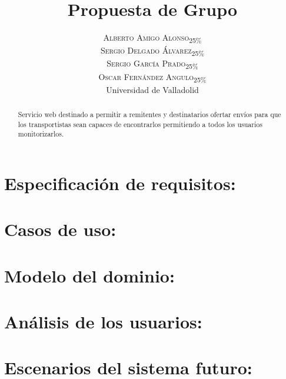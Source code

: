 \documentclass[10pt, a4paper,spanish]{article}
\title{\vspace{-15mm}\fontsize{24pt}{10pt}\selectfont\textbf{Propuesta de Grupo}} %
\author{
\large
\textsc{Alberto Amigo Alonso\textsubscript{25\%}}\\[2mm] %
\textsc{Sergio Delgado Álvarez\textsubscript{25\%}}\\[2mm] %
\textsc{Sergio García Prado\textsubscript{25\%}}\\[2mm] %
\textsc{Oscar Fernández Angulo\textsubscript{25\%}}\\[2mm] %
\normalsize Universidad de Valladolid \\ %
\vspace{-5mm}
}
\date{}
\begin{document}
	\maketitle %

	\thispagestyle{fancy} %


	\begin{abstract}
		\noindent Servicio web destinado a permitir a remitentes y destinatarios ofertar envíos para que los transportistas sean capaces de encontrarlos permitiendo a todos los usuarios monitorizarlos.
	\end{abstract}

	\section{Especificación de requisitos:}

		\paragraph{}


	\section{Casos de uso:}

		\paragraph{}


	\section{Modelo del dominio:}

		\paragraph{}


	\section{Análisis de los usuarios:}

		\paragraph{}


	\section{Escenarios del sistema futuro:}

		\paragraph{}
\end{document}
